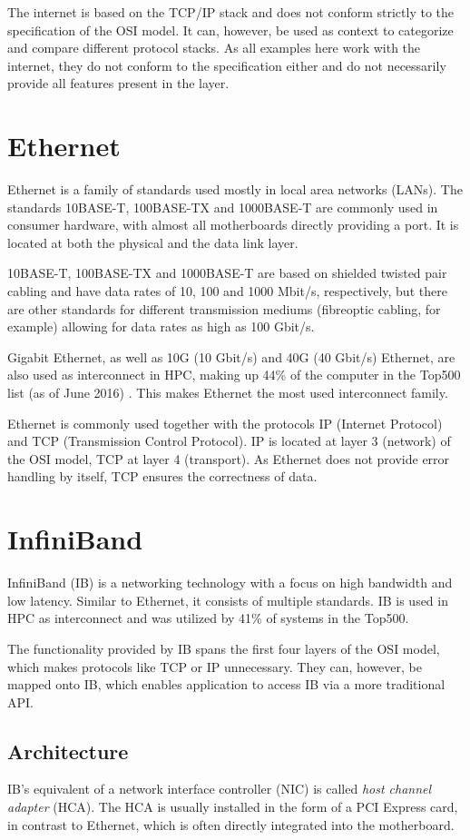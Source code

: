 \documentclass[12pt, a4paper]{article}
\begin{document}
The internet is based on the TCP/IP stack and does not conform strictly to the specification of the OSI model. It can, however, be used as context to categorize and compare different protocol stacks. As all examples here work with the internet, they do not conform to the specification either and do not necessarily provide all features present in the layer.

\section{Ethernet}
Ethernet is a family of standards used mostly in local area networks (LANs). The standards 10BASE-T, 100BASE-TX and 1000BASE-T are commonly used in consumer hardware, with almost all motherboards directly providing a port. It is located at both the physical and the data link layer.

10BASE-T, 100BASE-TX and 1000BASE-T are based on shielded twisted pair cabling and have data rates of 10, 100 and 1000 Mbit/s, respectively, but there are other standards for different transmission mediums (fibreoptic cabling, for example) allowing for data rates as high as 100 Gbit/s.

Gigabit Ethernet, as well as 10G (10 Gbit/s) and 40G (40 Gbit/s) Ethernet, are also used as interconnect in HPC, making up 44\% of the computer in the Top500 list (as of June 2016) \cite{top500list}. This makes Ethernet the most used interconnect family.

Ethernet is commonly used together with the protocols IP (Internet Protocol) and TCP (Transmission Control Protocol). IP is located at layer 3 (network) of the OSI model, TCP at layer 4 (transport). As Ethernet does not provide error handling by itself, TCP ensures the correctness of data.

\section{InfiniBand}
InfiniBand (IB) is a networking technology with a focus on high bandwidth and low latency. Similar to Ethernet, it consists of multiple standards. IB is used in HPC as interconnect and was utilized by 41\% of systems in the Top500.

The functionality provided by IB spans the first four layers of the OSI model, which makes protocols like TCP or IP unnecessary. They can, however, be mapped onto IB, which enables application to access IB via a more traditional API.

\subsection{Architecture}
IB's equivalent of a network interface controller (NIC) is called \textit{host channel adapter} (HCA). The HCA is usually installed in the form of a PCI Express card, in contrast to Ethernet, which is often directly integrated into the motherboard.
\end{document}
